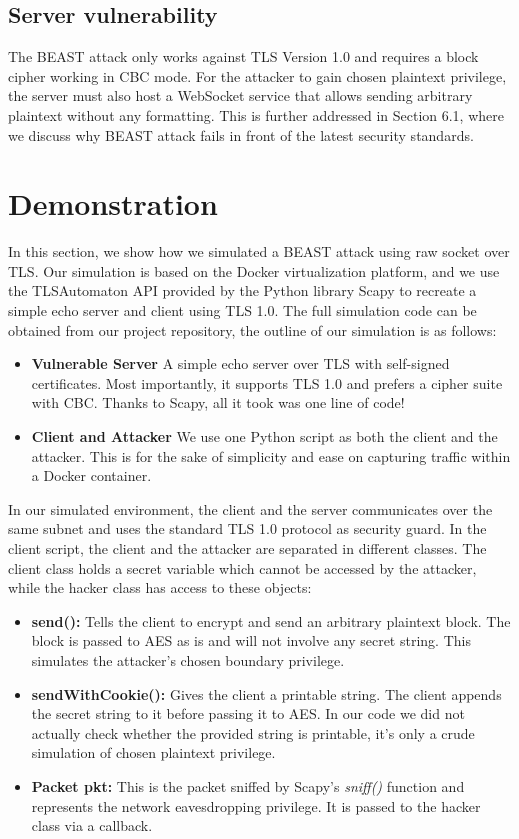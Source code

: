 \documentclass{acm_proc_article-sp}
\begin{document}
\subsection{Server vulnerability}
The BEAST attack only works against TLS Version 1.0 and requires a block cipher working in CBC
mode. For the attacker to gain chosen plaintext privilege, the server must also host a WebSocket
service that allows sending arbitrary plaintext without any formatting. This is further addressed in
Section 6.1, where we discuss why BEAST attack fails in front of the latest security standards.

\section{Demonstration}
In this section, we show how we simulated a BEAST attack using raw socket over TLS.
Our simulation is based on the Docker virtualization platform, and we use the TLSAutomaton API
provided by the Python library Scapy\cite{scapy} to recreate a simple echo server and client using
TLS 1.0. The full simulation code can be obtained from our project repository, the outline of our
simulation is as follows:
\begin{itemize}
    \item \textbf{Vulnerable Server} A simple echo server over TLS with self-signed certificates. Most
    importantly, it supports TLS 1.0 and prefers a cipher suite with CBC. Thanks to Scapy, all it took
    was one line of code!
    \item \textbf{Client and Attacker} We use one Python script as both the client and the attacker. This
    is for the sake of simplicity and ease on capturing traffic within a Docker container.
\end{itemize}
In our simulated environment, the client and the server communicates over the same subnet and
uses the standard TLS 1.0 protocol as security guard. In the client script, the client and the attacker
are separated in different classes. The client class holds a secret variable which cannot be accessed
by the attacker, while the hacker class has access to these objects:
\begin{itemize}
    \item \textbf{send():} Tells the client to encrypt and send an arbitrary plaintext block. The block is
    passed to AES as is and will not involve any secret string. This simulates the attacker's chosen
    boundary privilege.
    \item \textbf{sendWithCookie():} Gives the client a printable string. The client appends the secret
    string to it before passing it to AES. In our code we did not actually check whether the provided
    string is printable, it's only a crude simulation of chosen plaintext privilege.
    \item \textbf{Packet pkt:} This is the packet sniffed by Scapy's \textit{sniff()} function and
    represents the network eavesdropping privilege. It is passed to the hacker class via a callback.
\end{itemize}
\end{document}
